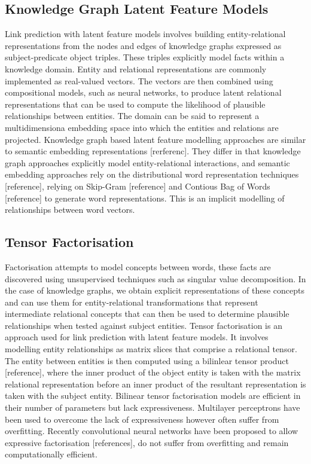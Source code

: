 \subsection{Knowledge Graph Latent Feature Models}
Link prediction with latent feature models involves building entity-relational representations from the nodes and edges of knowledge graphs expressed as subject-predicate object triples. These triples explicitly model facts within a knowledge domain. Entity and relational representations are commonly implemented as real-valued vectors. The vectors are then combined using compositional models, such as neural networks, to produce latent relational representations that can be used to compute the likelihood of plausible relationships between entities. The domain can be said to represent a multidimensiona embedding space into which the entities and relations are projected. Knowledge graph based latent feature modelling approaches are similar to semantic embedding representations [rerferenc]. They differ in that knowledge graph approaches explicitly model entity-relational interactions,  and semantic embedding approaches rely on the distributional word representation techniques [reference], relying on Skip-Gram [reference] and Contious Bag of Words [reference] to generate word representations. This is an implicit modelling of relationships between word vectors. \newline
\subsection{Tensor Factorisation}
Factorisation attempts to model concepts between words, these facts are discovered using unsupervised techniques such as singular value decomposition. In the case of knowledge graphs, we obtain explicit representations of these concepts and can use them for entity-relational transformations that represent intermediate relational concepts that can then be used to determine plausible relationships when tested against subject entities.
Tensor factorisation is an approach used for link prediction with latent feature models. It involves modelling entity relationships as matrix slices that comprise a relational tensor. The entity between entities is then computed using a bilinlear tensor product [reference], where the inner product of the object entity is taken with the matrix relational representation before an inner product of the resultant representation is taken with the subject entity. Bilinear tensor factorisation models are efficient in their number of parameters but lack expressiveness. Multilayer perceptrons have been used to overcome the lack of expressiveness however often suffer from overfitting. Recently convolutional neural networks have been proposed to allow expressive factorisation [references], do not suffer from overfitting and remain computationally efficient. \newline

